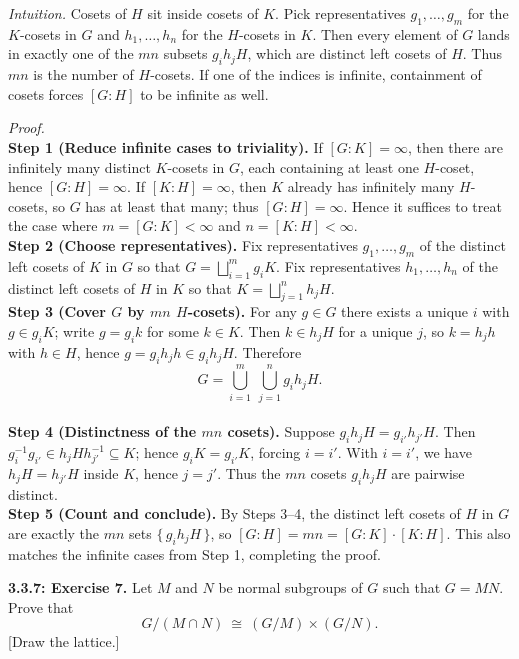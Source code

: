 \documentclass[12pt]{article}
\theoremstyle{definition}
\begin{document}
\dotfill

\emph{Intuition.} Cosets of $H$ sit inside cosets of $K$. Pick representatives $g_1,\dots,g_m$ for the $K$-cosets in $G$ and $h_1,\dots,h_n$ for the $H$-cosets in $K$. Then every element of $G$ lands in exactly one of the $mn$ subsets $g_i h_j H$, which are distinct left cosets of $H$. Thus $mn$ is the number of $H$-cosets. If one of the indices is infinite, containment of cosets forces $[G:H]$ to be infinite as well.\\

\dotfill

\emph{Proof.}\\
\textbf{Step 1 (Reduce infinite cases to triviality).} If $[G:K]=\infty$, then there are infinitely many distinct $K$-cosets in $G$, each containing at least one $H$-coset, hence $[G:H]=\infty$. If $[K:H]=\infty$, then $K$ already has infinitely many $H$-cosets, so $G$ has at least that many; thus $[G:H]=\infty$. Hence it suffices to treat the case where $m=[G:K]<\infty$ and $n=[K:H]<\infty$.\\
\textbf{Step 2 (Choose representatives).} Fix representatives $g_1,\dots,g_m$ of the distinct left cosets of $K$ in $G$ so that $G=\bigsqcup_{i=1}^m g_i K$. Fix representatives $h_1,\dots,h_n$ of the distinct left cosets of $H$ in $K$ so that $K=\bigsqcup_{j=1}^n h_j H$.\\
\textbf{Step 3 (Cover $G$ by $mn$ $H$-cosets).} For any $g\in G$ there exists a unique $i$ with $g\in g_i K$; write $g=g_i k$ for some $k\in K$. Then $k\in h_j H$ for a unique $j$, so $k=h_j h$ with $h\in H$, hence $g=g_i h_j h\in g_i h_j H$. Therefore
\[
G=\bigcup_{i=1}^m\ \bigcup_{j=1}^n g_i h_j H .
\]
\\
\textbf{Step 4 (Distinctness of the $mn$ cosets).} Suppose $g_i h_j H=g_{i'} h_{j'} H$. Then $g_{i}^{-1}g_{i'}\in h_j H h_{j'}^{-1}\subseteq K$; hence $g_{i}K=g_{i'}K$, forcing $i=i'$. With $i=i'$, we have $h_j H=h_{j'} H$ inside $K$, hence $j=j'$. Thus the $mn$ cosets $g_i h_j H$ are pairwise distinct.\\
\textbf{Step 5 (Count and conclude).} By Steps 3–4, the distinct left cosets of $H$ in $G$ are exactly the $mn$ sets $\{\,g_i h_j H\,\}$, so $[G:H]=mn=[G:K]\cdot[K:H]$. This also matches the infinite cases from Step 1, completing the proof.\\

\newpage

\noindent \textbf{3.3.7: Exercise 7.} Let $M$ and $N$ be normal subgroups of $G$ such that $G=MN$. Prove that
\[
G/(M\cap N)\ \cong\ (G/M)\times(G/N).
\]
[Draw the lattice.]\\ %
\end{document}
